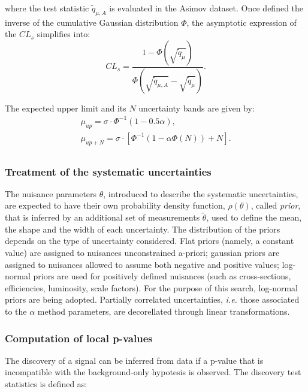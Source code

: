 \noindent where the test statistic $\tilde{q}_{\mu, A}$ is evaluated in the Asimov dataset. Once defined the inverse of the cumulative Gaussian distribution $\Phi$, the asymptotic expression of the $CL_s$ simplifies into:
\begin{equation}
CL_s = \frac{1 - \Phi \left( \sqrt{\tilde{q}_{\mu}} \right)}{ \Phi \left( \sqrt{\tilde{q}_{\mu, A}} - \sqrt{\tilde{q}_{\mu}} \right) }.
\end{equation}

\noindent The expected upper limit and its $N$ uncertainty bands are given by:
\begin{equation}
\begin{gathered}
\mu_{up} = \sigma \cdot \Phi^{-1} \left( 1 - 0.5 \alpha \right),\\
\mu_{up + N} = \sigma \cdot \left[ \Phi^{-1}  \left( 1 - \alpha \Phi(N)  \right) + N \right].\\
\end{gathered}
\end{equation}

\subsubsection{Treatment of the systematic uncertainties}
The nuisance parameters $\theta$, introduced to describe the systematic uncertainties, are expected to have their own probability density function, $\rho (\theta)$, called \emph{prior}, that is inferred by an additional set of measurements $\tilde{\theta}$, used to define the mean, the shape and the width of each uncertainty. The distribution of the priors depends on the type of uncertainty considered. Flat priors (namely, a constant value) are assigned to nuisances unconstrained a-priori; gaussian priors are assigned to nuisances allowed to assume both negative and positive values; log-normal priors are used for positively defined nuisances (such as cross-sections, efficiencies, luminosity, scale factors). For the purpose of this search, log-normal priors are being adopted. Partially correlated uncertainties, \textit{i.e.} those associated to the $\alpha$ method parameters, are decorellated through linear transformations.

\subsubsection{Computation of local p-values}
The discovery of a signal can be inferred from data if a p-value that is incompatible with the background-only hypotesis is observed. The discovery test statistics is defined as:

